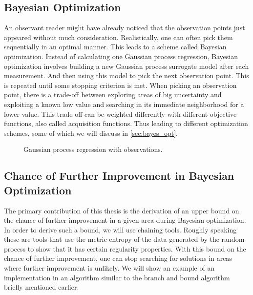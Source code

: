 \subsection*{Bayesian Optimization}
An observant reader might have already noticed that the observation points just appeared without much consideration. 
Realistically, one can often pick them sequentially in an optimal manner.
This leads to a scheme called Bayesian optimization.
Instead of calculating one Gaussian process regression, Bayesian optimization involves building a new Gaussian process surrogate model after each measurement. And then using this model to pick the next observation point.
This is repeated until some stopping criterion is met.
When picking an observation point, there is a trade-off between exploring areas of big uncertainty and exploiting a known low value and searching in its immediate neighborhood for a lower value.
This trade-off can be weighted differently with different objective functions, also called acquisition functions. Thus leading to different optimization schemes, some of which we will discuss in \cref{sec:bayes_opt}.
\begin{figure}[t]
    \centering
    
    \caption{Gaussian process regression with observations.}
    \label{fig:sausage_plot_posterior_matern}
\end{figure}





\subsection*{Chance of Further Improvement in Bayesian Optimization}
The primary contribution of this thesis is the derivation of an upper bound on the chance of further improvement in a given area during Bayesian optimization.
In order to derive such a bound, we will use chaining tools.
Roughly speaking these are tools that use the metric entropy of the data generated by the random process to show that it has certain regularity properties.
With this bound on the chance of further improvement, one can stop searching for solutions in areas where further improvement is unlikely.
We will show an example of an implementation in an algorithm similar to the branch and bound algorithm briefly mentioned earlier.





